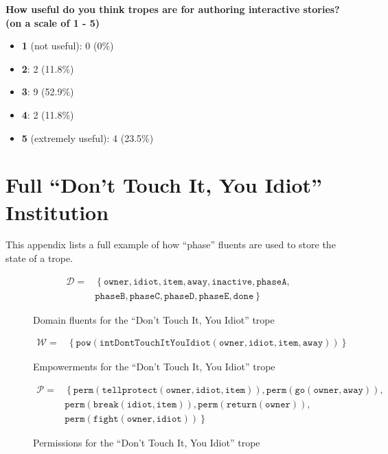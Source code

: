 \documentclass[11pt]{report}
\begin{document}
\textbf{How useful do you think tropes are for authoring interactive stories?
  (on a scale of 1 - 5)}
\begin{itemize}
  \item \textbf{1} (not useful): 0 (0\%)
  \item \textbf{2}: 2 (11.8\%)
  \item \textbf{3}: 9 (52.9\%)
  \item \textbf{4}: 2 (11.8\%)
  \item \textbf{5} (extremely useful): 4 (23.5\%)
\end{itemize}

\chapter{Full ``Don't Touch It, You Idiot'' Institution}
\label{appendix:sausages-full}
This appendix lists a full example of how ``phase'' fluents are used to store
the state of a trope.

\begin{figure}[!th]
\begin{align*}
  \mathcal{D} =&\left\{\mathtt{owner, idiot, item, away, inactive, phaseA,}\right.\\\nonumber
  &\left. {} \mathtt{phaseB, phaseC, phaseD, phaseE, done}\right\} %
\end{align*}
\caption{Domain fluents for the ``Don't Touch It, You Idiot'' trope}\label{eq:sausages-domain}
\end{figure}

\begin{figure}[!th]
\begin{align*}
  \mathcal{W} =&\left\{\mathtt{pow(intDontTouchItYouIdiot(owner, idiot, item, away))}\right\}
\end{align*}
\caption{Empowerments for the ``Don't Touch It, You Idiot'' trope}\label{eq:sausages-power}
\end{figure}

\begin{figure}[!th]
\begin{align*}
  \mathcal{P} =& \left\{\mathtt{perm(tellprotect(owner, idiot, item)), perm(go(owner, away)),}\right.\nonumber\\
  &\left. {} \mathtt{perm(break(idiot, item)), perm(return(owner)),}\right.\nonumber\\
             &\left. {} \mathtt{perm(fight(owner, idiot))}\right\} %
\end{align*}
\caption{Permissions for the ``Don't Touch It, You Idiot'' trope}\label{eq:sausages-perms}
\end{figure}
\end{document}
